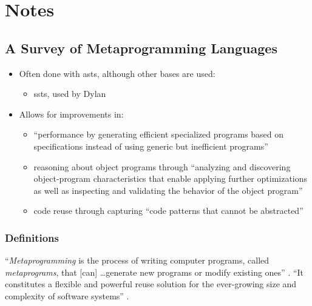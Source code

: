 \chapter{Notes}
\label{chap:notes}

\section{A Survey of Metaprogramming Languages}
\label{chap:notes:sec:metalang-survey}

\begin{itemize}
      \item Often done with \acfp{ast}, 
            although other bases are used:
            \begin{itemize}
                  \item \acfp{sst}, used by Dylan
                        \cite[p.~113:6]{lilis_survey_2019}
            \end{itemize}
      \item Allows for improvements in:
            \begin{itemize}
                  \item ``performance by generating efficient specialized
                        programs based on specifications instead of using
                        generic but inefficient programs''
                        \cite[p.~113:2]{lilis_survey_2019}
                  \item reasoning about object programs through ``analyzing
                        and discovering object-program characteristics that
                        enable applying further optimizations as well as
                        inspecting and validating the behavior of the object
                        program'' \cite[p.~113:2]{lilis_survey_2019}
                  \item code reuse through capturing ``code patterns that cannot
                        be abstracted'' \cite[p.~113:2]{lilis_survey_2019}
            \end{itemize}
\end{itemize}

\subsection{Definitions}

``\emph{Metaprogramming} is the process of writing computer programs, called
\emph{metaprograms}, that [can] \dots generate new programs or modify existing
ones'' \cite[p.~113:1]{lilis_survey_2019}. ``It constitutes a flexible and
powerful reuse solution for the ever-growing size and complexity of software
systems'' \cite[p.~113:31]{lilis_survey_2019}.

